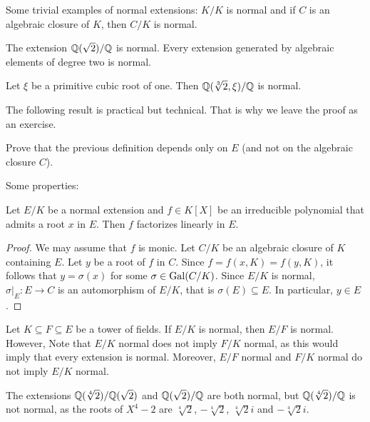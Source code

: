 Some trivial examples of normal extensions: $K/K$ is normal
and if $C$ is an algebraic closure of $K$, then $C/K$ is normal. 

\begin{example}
    The extension $\mathbb{Q}(\sqrt{2})/\mathbb{Q}$ is normal. 
    Every extension generated by algebraic elements of degree two is normal. 
\end{example}

\begin{exercise}
    Let $\xi$ be a primitive cubic root of one. Then 
    $\mathbb{Q}(\sqrt[3]{2},\xi)/\mathbb{Q}$ is normal. 
\end{exercise}

The following result is practical but technical. That is why we leave the proof
as an exercise. 

\begin{exercise}
    Prove that the previous definition depends only on $E$ (and not on the
    algebraic closure $C$). 
\end{exercise}

Some properties:

\begin{proposition}
    Let $E/K$ be a normal extension and $f\in K[X]$ be an irreducible polynomial
    that admits a root $x$ in $E$. Then $f$ factorizes
    linearly in $E$.
\end{proposition}

\begin{proof}
    We may assume that $f$ is monic. Let $C/K$ be an algebraic closure of $K$ containing $E$. 
    Let $y$ be a root of $f$ in $C$. Since $f=f(x,K)=f(y,K)$, 
    it follows that $y=\sigma(x)$ for some $\sigma\in\operatorname{Gal}(C/K)$. Since 
    $E/K$ is normal, $\sigma|_E\colon E\to C$ is an automorphism of $E/K$, that is
    $\sigma(E)\subseteq E$. In particular, $y\in E$. 
\end{proof}

Let $K\subseteq F\subseteq E$ be a tower of fields. 
If $E/K$ is normal, then $E/F$ is normal. However, 
Note that $E/K$ normal does not imply $F/K$ normal, as this would imply 
that every extension is normal. Moreover, 
$E/F$ normal and $F/K$ normal do not imply $E/K$ normal.
    
\begin{example}
The extensions $\mathbb{Q}(\sqrt[4]{2})/\mathbb{Q}(\sqrt{2})$ and $\mathbb{Q}(\sqrt{2})/\mathbb{Q}$ are both
normal, but $\mathbb{Q}(\sqrt[4]{2})/\mathbb{Q}$ is not normal, 
as the roots of $X^4-2$ are
$\sqrt[4]{2}$, $-\sqrt[4]{2}$, $\sqrt[4]{2}i$ and $-\sqrt[4]{2}i$.
\end{example}


